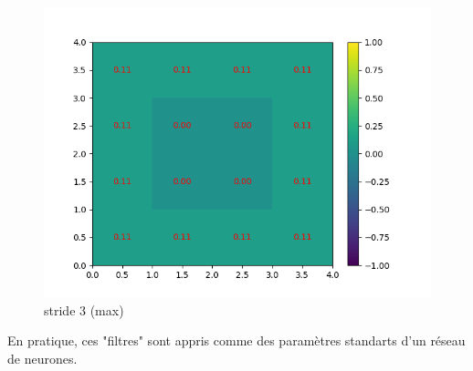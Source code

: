 \begin{figure}[h]
        \includegraphics[width=\textwidth]{img/cnn_exemple/square/stride_3_max.png}
        \caption{stride 3 (max)}
    \endminipage
\end{figure}

En pratique, ces "filtres" sont appris comme des paramètres standarts d'un réseau de neurones.



